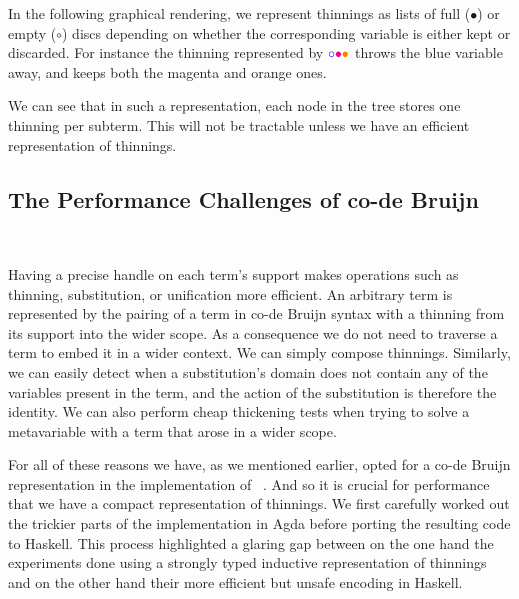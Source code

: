 In the following graphical rendering, we represent thinnings as lists of full
($\bullet$) or empty ($\circ$) discs depending on whether the corresponding
variable is either kept or discarded.
For instance the thinning represented by
$\color{blue}{\circ}\color{magenta}{\bullet}\color{orange}{\bullet}$
throws the {\color{blue}blue} variable away, and keeps both the
{\color{magenta}magenta} and {\color{orange}orange} ones.


We can see that in such a representation, each node in the tree stores one
thinning per subterm. This will not be tractable unless we have an efficient
representation of thinnings.


\subsection{The Performance Challenges of co-de Bruijn}~\label{sec:thinningsintypos}

Having a precise handle on each term's support makes operations such as thinning,
substitution, or unification more efficient.
%
An arbitrary term is represented by the pairing of a term in co-de Bruijn syntax
with a thinning from its support into the wider scope.
%
As a consequence we do not need to traverse a term to embed it in a wider context.
We can simply compose thinnings.
%
Similarly, we can easily detect when a substitution's domain does not contain any
of the variables present in the term, and the action of the substitution is therefore
the identity.
%
We can also perform cheap thickening tests when trying to solve a metavariable with
a term that arose in a wider scope.

For all of these reasons we have, as we mentioned earlier, opted for a co-de Bruijn
representation in the implementation of \typos~\cite{MANUAL:talk/types/Allais22}.
%
And so it is crucial for performance that we have a compact representation of thinnings.
%
We first carefully worked out the trickier parts of the implementation in Agda before
porting the resulting code to Haskell.
%
This process highlighted a glaring gap between on the one hand the experiments done
using a strongly typed inductive representation of thinnings and on the other hand
their more efficient but unsafe encoding in Haskell.

